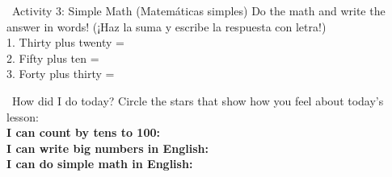 \begin{activity}{ \ Activity 3: Simple Math (Matemáticas simples)}
  Do the math and write the answer in words! (¡Haz la suma y escribe la respuesta con letra!)\\[1em]
  1. Thirty plus twenty = \answerline[5cm]\\
  2. Fifty plus ten = \answerline[5cm]\\
  3. Forty plus thirty = \answerline[5cm]
\end{activity}

\vspace{1em}
\begin{grammartip}{ \ How did I do today?}
  Circle the stars that show how you feel about today's lesson:\\[6pt]
  \textbf{I can count by tens to 100:} \selfcheck[0] \\[4pt]
  \textbf{I can write big numbers in English:} \selfcheck[0] \\[4pt]
  \textbf{I can do simple math in English:} \selfcheck[0]
\end{grammartip}
